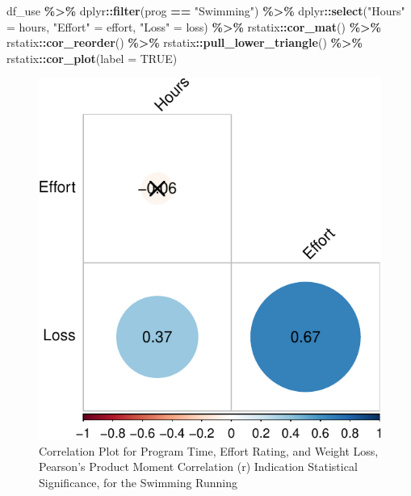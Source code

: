 \documentclass[
]{article}
\newenvironment{Shaded}{\begin{snugshade}}{\end{snugshade}}
\newcommand{\AttributeTok}[1]{\textcolor[rgb]{0.13,0.29,0.53}{#1}}
\newcommand{\ConstantTok}[1]{\textcolor[rgb]{0.56,0.35,0.01}{#1}}
\newcommand{\FunctionTok}[1]{\textcolor[rgb]{0.13,0.29,0.53}{\textbf{#1}}}
\newcommand{\NormalTok}[1]{#1}
\newcommand{\OtherTok}[1]{\textcolor[rgb]{0.56,0.35,0.01}{#1}}
\newcommand{\SpecialCharTok}[1]{\textcolor[rgb]{0.81,0.36,0.00}{\textbf{#1}}}
\newcommand{\StringTok}[1]{\textcolor[rgb]{0.31,0.60,0.02}{#1}}
\begin{document}
\clearpage

\begin{Shaded}
\begin{Highlighting}[]
\NormalTok{df\_use }\SpecialCharTok{\%\textgreater{}\%} 
\NormalTok{  dplyr}\SpecialCharTok{::}\FunctionTok{filter}\NormalTok{(prog }\SpecialCharTok{==} \StringTok{"Swimming"}\NormalTok{) }\SpecialCharTok{\%\textgreater{}\%} 
\NormalTok{  dplyr}\SpecialCharTok{::}\FunctionTok{select}\NormalTok{(}\StringTok{"Hours"} \OtherTok{=}\NormalTok{ hours, }
                \StringTok{"Effort"} \OtherTok{=}\NormalTok{ effort, }
                \StringTok{"Loss"} \OtherTok{=}\NormalTok{ loss) }\SpecialCharTok{\%\textgreater{}\%} 
\NormalTok{  rstatix}\SpecialCharTok{::}\FunctionTok{cor\_mat}\NormalTok{() }\SpecialCharTok{\%\textgreater{}\%}   
\NormalTok{  rstatix}\SpecialCharTok{::}\FunctionTok{cor\_reorder}\NormalTok{() }\SpecialCharTok{\%\textgreater{}\%}
\NormalTok{  rstatix}\SpecialCharTok{::}\FunctionTok{pull\_lower\_triangle}\NormalTok{() }\SpecialCharTok{\%\textgreater{}\%}
\NormalTok{  rstatix}\SpecialCharTok{::}\FunctionTok{cor\_plot}\NormalTok{(}\AttributeTok{label =} \ConstantTok{TRUE}\NormalTok{)}
\end{Highlighting}
\end{Shaded}

\begin{figure}[hb]

\includegraphics{Appendix_ex_weightloss_files/figure-latex/unnamed-chunk-25-1} \hfill{}

\caption{Correlation Plot for Program Time, Effort Rating, and Weight Loss, Pearson's Product Moment Correlation (r) Indication Statistical Significance, for the Swimming Running}\label{fig:unnamed-chunk-25}
\end{figure}
\end{document}
